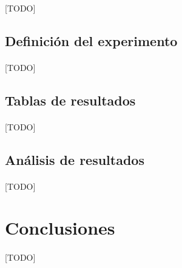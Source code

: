 \documentclass{subfiles}
\begin{document}
      \paragraph{}
      [TODO]

      \subsection{Definición del experimento}
      \label{sec:results_definition}

        \paragraph{}
        [TODO]

      \subsection{Tablas de resultados}
      \label{sec:results_tables}

        \paragraph{}
        [TODO]

      \subsection{Análisis de resultados}
      \label{sec:results_analysis}

        \paragraph{}
        [TODO]

    \section{Conclusiones}
    \label{sec:implementation_results_conclusions}

      \paragraph{}
      [TODO]
\end{document}
